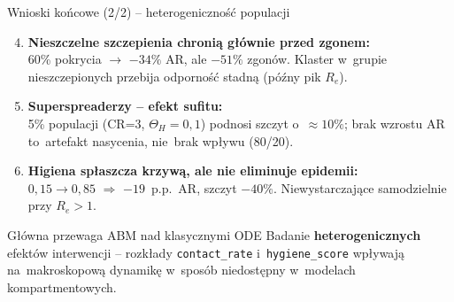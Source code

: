 \documentclass[aspectratio=1610, polish]{beamer}
\begin{document}
\begin{frame}{Wnioski końcowe (2/2) -- heterogeniczność populacji}
  \begin{enumerate}
    \setcounter{enumi}{3}
    \item \textbf{Nieszczelne szczepienia chronią głównie przed zgonem:}\\
          60\% pokrycia $\to$ $-34\%$ AR, ale $-51\%$ zgonów. Klaster w~grupie
          nieszczepionych przebija odporność stadną (późny pik $R_e$).

    \vspace{0.2cm}
    \item \textbf{Superspreaderzy -- efekt sufitu:}\\
          5\% populacji (CR=3, $\Theta_H=0{,}1$) podnosi szczyt o~$\approx10\%$;
          brak wzrostu AR to~artefakt nasycenia, nie~brak wpływu (80/20).

    \vspace{0.2cm}
    \item \textbf{Higiena spłaszcza krzywą, ale nie eliminuje epidemii:}\\
          $0{,}15\to0{,}85$ $\Rightarrow$ $-19$~p.p.\ AR, szczyt $-40\%$.
          Niewystarczające samodzielnie przy $R_e>1$.
  \end{enumerate}

  \vspace{0.2cm}
  \begin{block}{Główna przewaga ABM nad klasycznymi ODE}
    Badanie \textbf{heterogenicznych} efektów interwencji -- rozkłady
    \texttt{contact\_rate} i~\texttt{hygiene\_score} wpływają na~makroskopową
    dynamikę w~sposób niedostępny w~modelach kompartmentowych.
  \end{block}
\end{frame}
\end{document}
